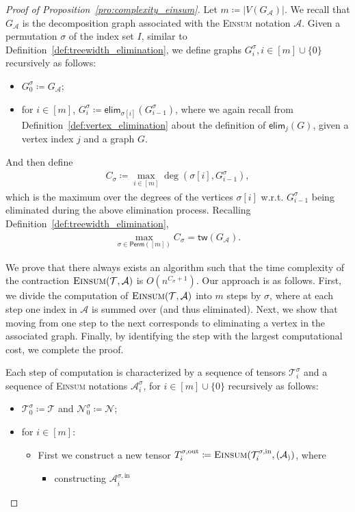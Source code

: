 \documentclass[sn-mathphys, natbib=false]{sn-jnl}
\theoremstyle{plain}
\theoremstyle{definition}
\def\Einsum{\textsc{Einsum}}
\newcommand{\perm}[1]{\mathsf{Perm}(#1)}
\newcommand{\tensorcontraction}{\textsc{Einsum}}
\newcommand{\degp}[2]{\deg(#1,#2)}
\newcommand{\verticesp}[1]{V(#1)}
\newcommand{\treewidthp}[1]{\mathsf{tw}(#1)}
\newcommand{\less}{O}
\newcommand{\eliminatevg}[2]{\mathsf{elim}_{#1}(#2)}
\def\calA{\mathcal{A}}
\def\calT{\mathcal{T}}
\def\calN{\mathcal{N}}
\begin{document}
\begin{bibunit}[agsm]
\iffalse
\begin{proof}[Proof of Proposition~\ref{pro:complexity_einsum}]
Let $m \coloneqq |\verticesp{G_\calA}|$. We recall that $G_{\calA}$ is the decomposition graph associated with the \Einsum{} notation $\calA$. Given a permutation $\sigma$ of the index set $I$, similar to Definition~\ref{def:treewidth_elimination}, we define graphs $G^\sigma_i, i \in [m] \cup \{0\}$ recursively as follows: 
\begin{itemize}
\item $G^\sigma_0 \coloneqq G_\calA$;
\item for $i \in [m]$, $G^\sigma_i \coloneqq \eliminatevg{\sigma[i]}{G^\sigma_{i-1}}$,  
where we again recall from Definition~\ref{def:vertex_elimination} about the definition of $\eliminatevg{j}{G}$, given a vertex index $j$ and a graph $G$.
\end{itemize}
And then define
\begin{align*}
C_\sigma \coloneqq \max_{i\in[m]}\degp{\sigma[i]}{G^\sigma_{i-1}},
\end{align*}
which is the maximum over the degrees of the vertices $\sigma[i]$ w.r.t. $G_{i - 1}^{\sigma}$ being eliminated during the above elimination process. Recalling Definition~\ref{def:treewidth_elimination}, 
\begin{align*}
    \max_{\sigma \in \perm{[m]}}C_\sigma = \treewidthp{G_\calA}. 
\end{align*}

We prove that there always exists an algorithm such that the time complexity of the contraction $\tensorcontraction(\calT, \calA)$ is $\less(n^{C_\sigma + 1})$. Our approach is as follows. First, we divide the computation of $\tensorcontraction(\calT,\calA)$ into $m$ steps by $\sigma$, where at each step one index in $\calA$ is summed over (and thus eliminated). Next, we show that moving from one step to the next corresponds to eliminating a vertex in the associated graph. Finally, by identifying the step with the largest computational cost, we complete the proof.

Each step of computation is characterized by a sequence of tensors $\calT^\sigma_i$ and a sequence of \Einsum{} notations $ \calA^\sigma_i$, for $i \in [m] \cup \{0\}$ recursively as follows:
\begin{itemize}
\item $\calT^\sigma_0 \coloneqq \calT$ and $\calN^\sigma_0 \coloneqq \calN$;

\item for $i \in [m]$:
\begin{itemize}
    \item First we construct a new tensor $T_{i}^{\sigma,\mathrm{out}} \coloneqq \tensorcontraction(\calT_i^{\sigma,\mathrm{in}}, (\calA_))$, where
    \begin{itemize}
        \item constructing $\calA^{\sigma, \mathrm{in}}_i$ 
    \end{itemize}
\end{itemize}
\end{itemize}



\end{proof}
\end{bibunit}
\end{document}
